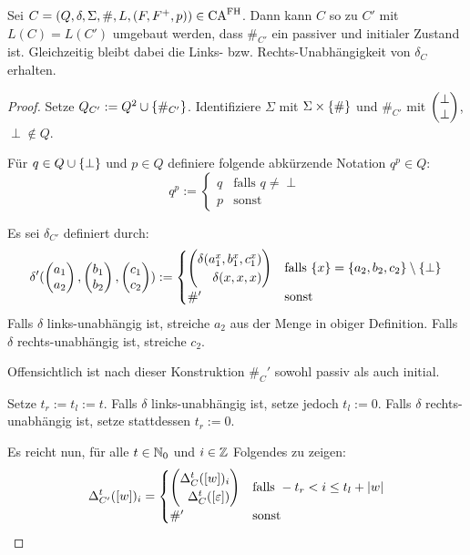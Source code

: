 \begin{satz}
    Sei $C = (Q, \delta, \Sigma, \#, L, (F, F^+, p)) \in \textrm{CA}^{\textrm{FH}}$.
    Dann kann $C$ so zu $C'$ mit $L(C) = L(C')$ umgebaut werden, dass $\#_{C'}$ ein passiver und initialer Zustand ist.
    Gleichzeitig bleibt dabei die Links- \acs{bzw.} Rechts-Unabhängigkeit von $\delta_C$ erhalten.
\end{satz}
\begin{proof}
    Setze $Q_{C'} := Q^2 \cup \{ { \#_{C'} } \}$. Identifiziere $\Sigma$ mit $ \Sigma \times \{ {\#} \}$ und $\#_{C'}$ mit $\Spvek{\perp; \perp}$, $\perp \not\in Q$.

    Für $q \in Q \cup \{ {\perp} \}$ und $p \in Q$ definiere folgende abkürzende Notation $q^p \in Q$:
    \[
        q^p := 
        \begin{cases}
            q & \text{falls } q \neq \perp \\
            p & \text{sonst}
        \end{cases}
    \]
    
    Es sei $\delta_{C'}$ definiert durch:
    \[
       \delta'(\Spvek{a_1; a_2}, \Spvek{b_1; b_2}, \Spvek{c_1; c_2}) :=
       \begin{cases}
         \Spvek{  \delta(a_1 ^ {x}, b_1 ^ {x}, c_1 ^ {x}); \delta(x, x, x)  } 
         & \text{falls }
         \finset{x} = \finset{a_2, b_2, c_2} \setminus \finset{ \perp } \\
         \#'
         & \text{sonst}
       \end{cases}
    \]
    Falls $\delta$ links-unabhängig ist, streiche $a_2$ aus der Menge in obiger Definition.
    Falls $\delta$ rechts-unabhängig ist, streiche $c_2$.
    
    Offensichtlich ist nach dieser Konstruktion $\#_C'$ sowohl passiv als auch initial.
    
    Setze $t_r := t_l := t$.
    Falls $\delta$ links-unabhängig ist, setze jedoch $t_l := 0$.
    Falls $\delta$ rechts-unabhängig ist, setze stattdessen $t_r := 0$.
    
    Es reicht nun, für alle $t \in \mathbb{N}_0$ und $i \in \mathbb{Z}$ Folgendes zu zeigen:
    \[
        \Delta_{C'}^t([w])_i = \begin{cases}
            \Spvek{\Delta_C^t([w])_i; \Delta^t_{C}([\varepsilon])} &
                \text{falls } -t_r < i \leq t_l + |w| \\
            \#' & \text{sonst}
        \end{cases}
    \]
    

\end{proof}
